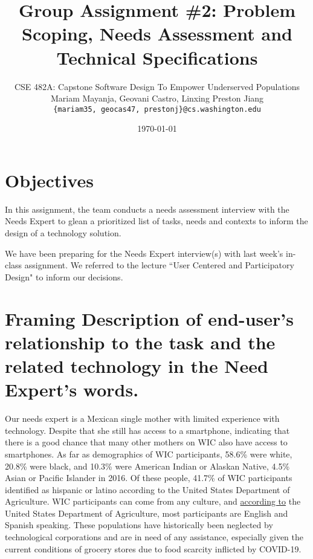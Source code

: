\documentclass{article}
\date{{\today}}
\begin{document}
\allowdisplaybreaks
\title{Group Assignment \#2: Problem Scoping, Needs Assessment and Technical Specifications}
\author{\normalsize{CSE 482A: Capstone Software Design To Empower Underserved Populations}\\
\normalsize{Mariam Mayanja, Geovani Castro, Linxing Preston Jiang} \\
\normalsize{\texttt{\{mariam35, geocas47, prestonj\}@cs.washington.edu}}}
\maketitle
\section{Objectives}
In this assignment, the team conducts a needs assessment interview with the Needs Expert to glean a prioritized list of tasks, needs and contexts to inform the design of a technology solution. \par
We have been preparing for the Needs Expert interview(s) with last week's in-class assignment. We referred to the lecture “User Centered and Participatory Design" to inform our decisions. 
\section{Framing Description of end-user's relationship to the task and the related technology in the Need Expert's words. }

Our needs expert is a Mexican single mother with limited experience with technology. Despite that she still has access to a smartphone, indicating that there is a good chance that many other mothers on WIC also have access to smartphones. As far as demographics of WIC participants, 58.6\% were white, 20.8\% were black, and 10.3\% were American Indian or Alaskan Native, 4.5\% Asian or Pacific Islander in 2016.  Of these people, 41.7\% of WIC participants identified as hispanic or latino according to the United States Department of Agriculture. WIC participants can come from any culture, and \href{https://fns-prod.azureedge.net/sites/default/files/ops/WICPC2016-Summary.pdf}{according to} the United States Department of Agriculture, most participants are English and Spanish speaking. These populations have historically been neglected by technological corporations and are in need of any assistance, especially given the current conditions of grocery stores due to food scarcity inflicted by COVID-19.\par
\end{document}
